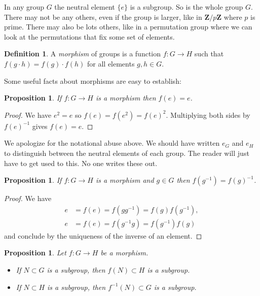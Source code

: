 \documentclass[11pt]{article}
\newtheorem{prop}[theo]{Proposition}
\theoremstyle{definition}
\newtheorem{defi}[theo]{Definition}
\def\ZZ{\mathbf{Z}}
\begin{document}
In any group $G$ the neutral element $\{ e \}$ is a subgroup.
So is the whole group $G$.
There may not be any others, even if the group is larger, like in $\ZZ / p \ZZ$
where $p$ is prime.
There may also be lots others, like in a permutation group where we can look at
the permutations that fix some set of elements.


\begin{defi}
A \emph{morphism} of groups is a function $f : G \to H$ such that
$f(g \cdot h) = f(g) \cdot f(h)$ for all elements $g,h \in G$.
\end{defi}


Some useful facts about morphisms are easy to establish:


\begin{prop}
If $f : G \to H$ is a morphism then $f(e) = e$.
\end{prop}

\begin{proof}
We have $e^2 = e$ so
$f(e) = f(e^2) = f(e)^2$.
Multiplying both sides by $f(e)^{-1}$ gives $f(e) = e$.
\end{proof}

We apologize for the notational abuse above.
We should have written $e_G$ and $e_H$ to distinguish between the neutral elements of each group.
The reader will just have to get used to this.
No one writes these out.


\begin{prop}
If $f : G \to H$ is a morphism and $g \in G$ then $f(g^{-1}) = f(g)^{-1}$.
\end{prop}

\begin{proof}
We have 
\begin{align*}
e &= f(e) = f(g g^{-1}) = f(g) f(g^{-1}),
\\
e &= f(e) = f(g^{-1} g) = f(g^{-1}) f(g)
\end{align*}
and conclude by the uniqueness of the inverse of an element.
\end{proof}


\begin{prop}
Let $f : G \to H$ be a morphism.
\begin{itemize}
\item
If $N \subset G$ is a subgroup, then $f(N) \subset H$ is a subgroup.

\item
If $N \subset H$ is a subgroup, then $f^{-1}(N) \subset G$ is a subgroup.
\end{itemize}
\end{prop}
\end{document}
